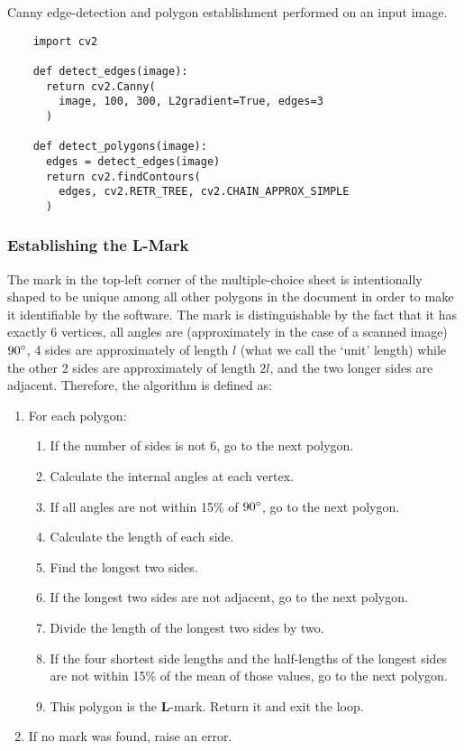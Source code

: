 \documentclass[12pt, letterpaper]{report}
\begin{document}
\begin{codesample}[!htbp]
  \caption{Canny edge-detection and polygon establishment performed on an input image.}
  \label{code:edgedetecting}
  \begin{verbatim}
    import cv2

    def detect_edges(image):
      return cv2.Canny(
        image, 100, 300, L2gradient=True, edges=3
      )

    def detect_polygons(image):
      edges = detect_edges(image)
      return cv2.findContours(
        edges, cv2.RETR_TREE, cv2.CHAIN_APPROX_SIMPLE
      )
  \end{verbatim}
\end{codesample}

\subsubsection{Establishing the \textbf{L}-Mark}
The mark in the top-left corner of the multiple-choice sheet is intentionally
shaped to be unique among all other polygons in the document in order to make it
identifiable by the software. The mark is distinguishable by the fact that it
has exactly 6 vertices, all angles are (approximately in the case of a scanned
image) $90\degree$, 4 sides are approximately of length $l$ (what we call
the `unit' length) while the other 2 sides are approximately of length $2l$,
and the two longer sides are adjacent. Therefore, the algorithm is defined as:

\begin{enumerate}
  \item For each polygon:
    \begin{enumerate}
      \item If the number of sides is not 6, go to the next polygon.
      \item Calculate the internal angles at each vertex.
      \item If all angles are not within 15\% of $90\degree$, go to the next polygon.
      \item Calculate the length of each side.
      \item Find the longest two sides.
      \item If the longest two sides are not adjacent, go to the next polygon.
      \item Divide the length of the longest two sides by two.
      \item If the four shortest side lengths and the half-lengths of the
        longest sides are not within 15\% of the mean of those values, go to
        the next polygon.
      \item This polygon is the \textbf{L}-mark. Return it and exit the loop.
    \end{enumerate}
  \item If no mark was found, raise an error.
\end{enumerate}
\end{document}
